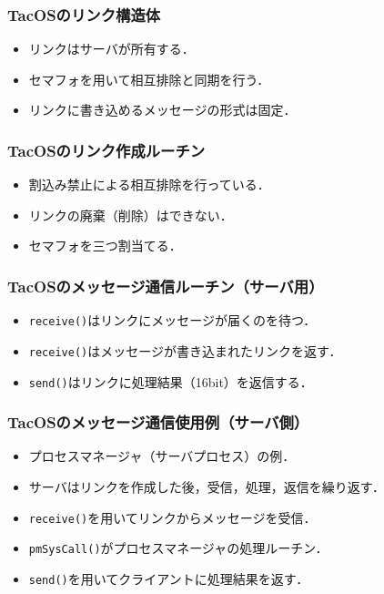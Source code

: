 \documentclass{beamer}                   %
\begin{document}
\begin{frame}
  \frametitle{TacOSのリンク構造体}
  
  \begin{itemize}
  \item リンクはサーバが所有する．
  \item セマフォを用いて相互排除と同期を行う．
  \item リンクに書き込めるメッセージの形式は固定．
  \end{itemize}
\end{frame}

\begin{frame}
  \frametitle{TacOSのリンク作成ルーチン}
  
  \begin{itemize}
  \item 割込み禁止による相互排除を行っている．
  \item リンクの廃棄（削除）はできない．
  \item セマフォを三つ割当てる．
  \end{itemize}
\end{frame}

\begin{frame}
  \frametitle{TacOSのメッセージ通信ルーチン（サーバ用）}
  
  \begin{itemize}
  \item {\tt receive()}はリンクにメッセージが届くのを待つ．
  \item {\tt receive()}はメッセージが書き込まれたリンクを返す．
  \item {\tt send()}はリンクに処理結果（16bit）を返信する．
  \end{itemize}
\end{frame}

\begin{frame}
  \frametitle{TacOSのメッセージ通信使用例（サーバ側）}
  
  \begin{itemize}
  \item プロセスマネージャ（サーバプロセス）の例．
  \item サーバはリンクを作成した後，受信，処理，返信を繰り返す．
  \item {\tt receive()}を用いてリンクからメッセージを受信．
  \item {\tt pmSysCall()}がプロセスマネージャの処理ルーチン．
  \item {\tt send()}を用いてクライアントに処理結果を返す．
  \end{itemize}
\end{frame}
\end{document}
